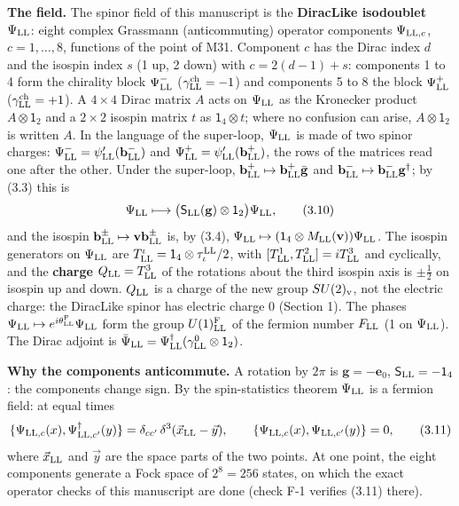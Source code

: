 \documentclass[
  10pt,
]{article}
\begin{document}
\textbf{The field.} The spinor field of this manuscript is the
\textbf{DiracLike isodoublet} \(\Psi_{\rm LL}\): eight complex Grassmann
(anticommuting) operator components \(\Psi_{{\rm LL},c}\),
\(c=1,\dots,8\), functions of the point of M31. Component \(c\) has the
Dirac index \(d\) and the isospin index \(s\) (1 up, 2 down) with
\(c=2(d-1)+s\): components 1 to 4 form the chirality block
\(\Psi^-_{\rm LL}\) (\(\gamma^{\rm ch}_{\rm LL}=-1\)) and components 5
to 8 the block \(\Psi^+_{\rm LL}\) (\(\gamma^{\rm ch}_{\rm LL}=+1\)). A
\(4\times4\) Dirac matrix \(A\) acts on \(\Psi_{\rm LL}\) as the
Kronecker product \(A\otimes\mathsf 1_2\) and a \(2\times2\) isospin
matrix \(t\) as \(\mathsf 1_4\otimes t\); where no confusion can arise,
\(A\otimes\mathsf 1_2\) is written \(A\). In the language of the
super-loop, \(\Psi_{\rm LL}\) is made of two spinor charges:
\(\Psi^-_{\rm LL}=\psi'_{\rm LL}(\mathbf b^-_{\rm LL})\) and
\(\Psi^+_{\rm LL}=\psi'_{\rm LL}(\mathbf b^+_{\rm LL})\), the rows of
the matrices read one after the other. Under the super-loop,
\(\mathbf b^+_{\rm LL}\mapsto\mathbf b^+_{\rm LL}\bar{\mathbf g}\) and
\(\mathbf b^-_{\rm LL}\mapsto\mathbf b^-_{\rm LL}\mathbf g^\dagger\); by
(3.3) this is
\[\Psi_{\rm LL}\longmapsto\big(\mathsf S_{\rm LL}(\mathbf g)\otimes\mathsf 1_2\big)\Psi_{\rm LL},\tag{3.10}\]
and the isospin
\(\mathbf b^\pm_{\rm LL}\mapsto\mathbf v\mathbf b^\pm_{\rm LL}\) is, by
(3.4),
\(\Psi_{\rm LL}\mapsto(\mathsf 1_4\otimes M_{\rm LL}(\mathbf v))\Psi_{\rm LL}\).
The isospin generators on \(\Psi_{\rm LL}\) are
\(T^\iota_{\rm LL}=\mathsf 1_4\otimes\tau^{\rm LL}_\iota/2\), with
\([T^1_{\rm LL},T^2_{\rm LL}]=iT^3_{\rm LL}\) and cyclically, and the
\textbf{charge} \(Q_{\rm LL}=T^3_{\rm LL}\) of the rotations about the
third isospin axis is \(\pm\tfrac12\) on isospin up and down.
\(Q_{\rm LL}\) is a charge of the new group \(SU(2)_{\rm v}\), not the
electric charge: the DiracLike spinor has electric charge 0 (Section 1).
The phases
\(\Psi_{\rm LL}\mapsto e^{i\theta^{\rm F}_{\rm LL}}\Psi_{\rm LL}\) form
the group \(U(1)^{\rm F}_{\rm LL}\) of the fermion number \(F_{\rm LL}\)
(1 on \(\Psi_{\rm LL}\)). The Dirac adjoint is
\(\bar\Psi_{\rm LL}=\Psi^\dagger_{\rm LL}(\gamma^0_{\rm LL}\otimes\mathsf 1_2)\).

\textbf{Why the components anticommute.} A rotation by \(2\pi\) is
\(\mathbf g=-\mathbf e_0\), \(\mathsf S_{\rm LL}=-\mathsf 1_4\): the
components change sign. By the spin-statistics theorem \(\Psi_{\rm LL}\)
is a fermion field: at equal times
\[\{\Psi_{{\rm LL},c}(x),\Psi^\dagger_{{\rm LL},c'}(y)\}=\delta_{cc'}\,\delta^3(\vec x_{\rm LL}-\vec y),\qquad\{\Psi_{{\rm LL},c}(x),\Psi_{{\rm LL},c'}(y)\}=0,\tag{3.11}\]
where \(\vec x_{\rm LL}\) and \(\vec y\) are the space parts of the two
points. At one point, the eight components generate a Fock space of
\(2^8=256\) states, on which the exact operator checks of this
manuscript are done (check F-1 verifies (3.11) there).
\end{document}
